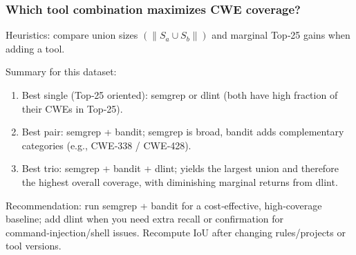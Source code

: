 \subsubsection{Which tool combination maximizes CWE coverage?}

Heuristics: compare union sizes $(\|S_a \cup S_b\|)$ and marginal Top‑25 gains when adding a tool.

Summary for this dataset:
\begin{enumerate}
  \item Best single (Top‑25 oriented): semgrep or dlint (both have high fraction of their CWEs in Top‑25).
  \item Best pair: semgrep + bandit; semgrep is broad, bandit adds complementary categories (e.g., CWE‑338 / CWE‑428).
  \item Best trio: semgrep + bandit + dlint; yields the largest union and therefore the highest overall coverage, with diminishing marginal returns from dlint.
\end{enumerate}

Recommendation: run semgrep + bandit for a cost‑effective, high‑coverage baseline; add dlint when you need extra recall or confirmation for command‑injection/shell issues. Recompute IoU after changing rules/projects or tool versions.




